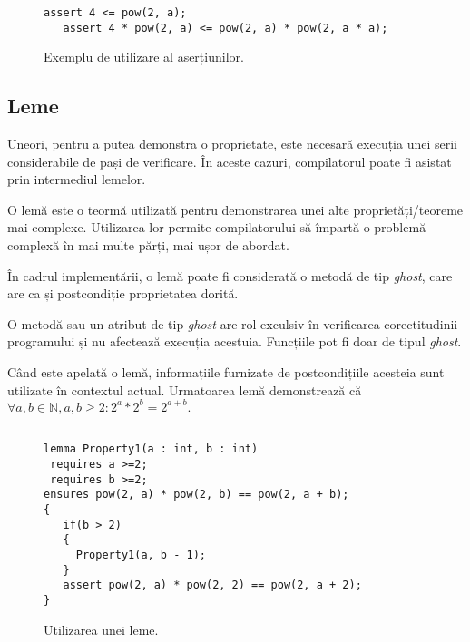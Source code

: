 \begin{figure}[H]
    \caption{Exemplu de utilizare al aserțiunilor.}

\begin{Verbatim}[fontsize=\small, frame=single,baselinestretch=0.1]
   assert 4 <= pow(2, a);
   assert 4 * pow(2, a) <= pow(2, a) * pow(2, a * a);
\end{Verbatim}

\end{figure}

\subsection{Leme}

Uneori, pentru a putea demonstra o proprietate, este necesară execuția unei serii considerabile de pași de verificare. În aceste cazuri, compilatorul poate fi asistat prin intermediul lemelor.

O lemă este o teormă utilizată pentru demonstrarea unei alte proprietăți/teoreme mai complexe. Utilizarea lor permite compilatorului să împartă o problemă complexă în mai multe părți, mai ușor de abordat.

În cadrul implementării, o lemă poate fi considerată o metodă de tip \textit{ghost}, care are ca și postcondiție proprietatea dorită.

\begin{definition}
O metodă sau un atribut de tip \textit{ghost} are rol exculsiv în verificarea corectitudinii programului și nu afectează execuția acestuia. Funcțiile pot fi doar de tipul \textit{ghost}.
\end{definition}

Când este apelată o lemă, informațiile furnizate de postcondițiile acesteia sunt utilizate în contextul actual. Urmatoarea lemă demonstrează că $\forall a, b \in \mathbb{N}, a, b \geq 2 : 2^a * 2^b = 2^{a + b}.$ 

\begin{figure}[H]
    \caption{Utilizarea unei leme.}

\begin{Verbatim}[fontsize=\small, frame=single,baselinestretch=0.1]

lemma Property1(a : int, b : int)
 requires a >=2;
 requires b >=2;
ensures pow(2, a) * pow(2, b) == pow(2, a + b);
{
   if(b > 2)
   {
     Property1(a, b - 1);
   }
   assert pow(2, a) * pow(2, 2) == pow(2, a + 2);
}
\end{Verbatim}

\end{figure}


